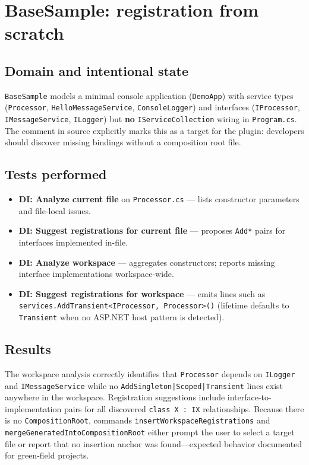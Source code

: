 \section{BaseSample: registration from scratch}
\label{chap5:basesample}

\subsection{Domain and intentional state}

\texttt{BaseSample} models a minimal console application (\texttt{DemoApp}) with service types (\texttt{Processor}, \texttt{HelloMessageService}, \texttt{ConsoleLogger}) and interfaces (\texttt{IProcessor}, \texttt{IMessageService}, \texttt{ILogger}) but \textbf{no} \texttt{IServiceCollection} wiring in \texttt{Program.cs}. The comment in source explicitly marks this as a target for the plugin: developers should discover missing bindings without a composition root file.

\subsection{Tests performed}

\begin{itemize}
	\item \textbf{DI: Analyze current file} on \texttt{Processor.cs} --- lists constructor parameters and file-local issues.
	\item \textbf{DI: Suggest registrations for current file} --- proposes \texttt{Add*} pairs for interfaces implemented in-file.
	\item \textbf{DI: Analyze workspace} --- aggregates constructors; reports missing interface implementations workspace-wide.
	\item \textbf{DI: Suggest registrations for workspace} --- emits lines such as \texttt{services.AddTransient<IProcessor, Processor>()} (lifetime defaults to \texttt{Transient} when no ASP.NET host pattern is detected).
\end{itemize}

\subsection{Results}

The workspace analysis correctly identifies that \texttt{Processor} depends on \texttt{ILogger} and \texttt{IMessageService} while no \texttt{AddSingleton|Scoped|Transient} lines exist anywhere in the workspace. Registration suggestions include interface-to-implementation pairs for all discovered \texttt{class X : IX} relationships. Because there is no \texttt{CompositionRoot}, commands \texttt{insertWorkspaceRegistrations} and \texttt{mergeGeneratedIntoCompositionRoot} either prompt the user to select a target file or report that no insertion anchor was found---expected behavior documented for green-field projects.

